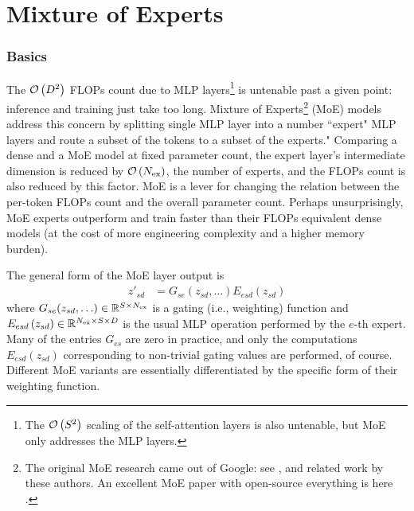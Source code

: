 \part{Mixture of Experts}

\section{Basics}

The $ \mathcal{O} \left(  D ^{ 2 } \right)  $ FLOPs count due to MLP layers\footnote{The $ \mathcal{O} \left( S
^{ 2 } \right)  $ scaling of the self-attention layers is also untenable, but MoE only addresses the
MLP layers.} is untenable past a given point: inference and training just take too long.  Mixture of
Experts\footnote{The original MoE research came out of Google: see
    \cite{fedus2022switchtransformersscalingtrillion},
    \cite{shazeer2017outrageouslylargeneuralnetworks} and related work by these authors. An
excellent MoE paper with open-source everything is here
\cite{muennighoff2024olmoeopenmixtureofexpertslanguage}. } (MoE) models address this concern by
splitting single MLP layer into a number ``expert" MLP layers and route a subset of the tokens to a
subset of the experts."  Comparing a dense and a MoE model at fixed parameter count, the expert
layer's intermediate dimension is reduced by $ \mathcal{O} \left( N _{ {\rm ex} } \right)  $, the number
of experts, and the FLOPs count is also reduced by this factor. MoE is a lever for changing the
relation between the per-token FLOPs count and the overall parameter count. Perhaps unsurprisingly,
MoE experts outperform and train faster than their FLOPs equivalent dense models (at the cost of
more engineering complexity and a higher memory burden).

The general form of the MoE layer output is
\begin{align}
    z' _{ sd } &=G _{ se }(z _{ sd }, \ldots )E _{ esd } \left ( z _{ sd } \right ) \label{eq_general_moe}
\end{align}
where $ G _{ se }(z _{ sd }, \ldots ) \in \mathbb{R} ^{ S \times N _{ {\rm ex}  } } $ is a gating (i.e.,
weighting) function and $ E _{ esd } \left ( z _{ sd } \right ) \in \mathbb{R} ^{ N _{ {\rm ex}
}\times S \times D } $ is the usual MLP operation performed by the $ e $-th expert. Many of the
entries $ G _{ es } $  are zero in practice, and only the computations $ E _{ esd } \left ( z _{ sd
} \right )$ corresponding to non-trivial gating values are performed, of course. Different MoE
variants are essentially differentiated by the specific form of their weighting function.


